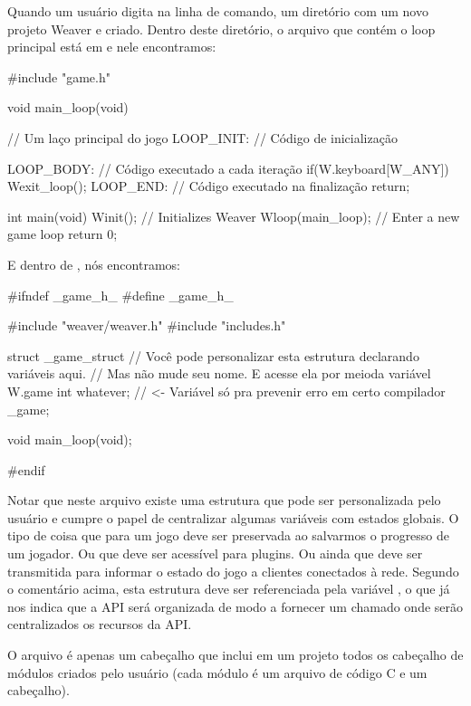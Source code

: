 

Quando um usuário digita  na linha de
comando, um diretório com um novo projeto Weaver e criado. Dentro
deste diretório, o arquivo que contém o loop principal está
em  e nele encontramos:

\linha
\alinhaverbatim
#include "game.h"

void main_loop(void){ // Um laço principal do jogo
 LOOP_INIT: // Código de inicialização 

 LOOP_BODY: // Código executado a cada iteração
    if(W.keyboard[W_ANY])
        Wexit_loop();
 LOOP_END: // Código executado na finalização
    return;
}

int main(void){
  Winit(); // Initializes Weaver
  Wloop(main_loop); // Enter a new game loop
  return 0;
}
\alinhanormal
\linha

E dentro de , nós encontramos:

\linha
\alinhaverbatim
#ifndef _game_h_
#define _game_h_

#include "weaver/weaver.h"
#include "includes.h"

struct _game_struct{
  // Você pode personalizar esta estrutura declarando variáveis aqui.
  // Mas não mude seu nome. E acesse ela por meioda variável W.game
  int whatever; // <- Variável só pra prevenir erro em certo compilador
} _game;

void main_loop(void);

#endif
\alinhanormal
\linha

Notar que neste arquivo existe uma estrutura que pode ser
personalizada pelo usuário e cumpre o papel de centralizar algumas
variáveis com estados globais. O tipo de coisa que para um jogo deve
ser preservada ao salvarmos o progresso de um jogador. Ou que deve ser
acessível para plugins. Ou ainda que deve ser transmitida para
informar o estado do jogo a clientes conectados à rede. Segundo o
comentário acima, esta estrutura deve ser referenciada pela
variável , o que já nos indica que a API será
organizada de modo a fornecer um 
chamado  onde serão centralizados os recursos da API.

O arquivo  é apenas um cabeçalho que inclui em
um projeto todos os cabeçalho de módulos criados pelo usuário (cada
módulo é um arquivo de código C e um cabeçalho).

